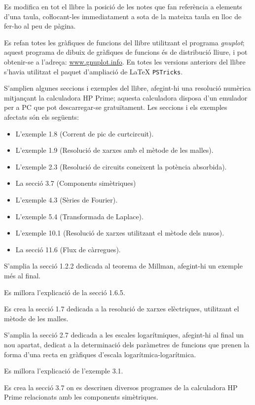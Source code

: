Es modifica en tot el llibre la posició de les notes que fan referència a elements d'una taula, coŀlocant-les immediatament a sota de la mateixa taula en lloc de fer-ho al peu de pàgina.

Es refan totes les gràfiques de funcions del llibre utilitzant el programa \emph{gnuplot}; aquest programa de dibuix de gràfiques de funcions és de distribució lliure, i pot obtenir-se a l'adreça: \href{http://www.gnuplot.info/}{www.gnuplot.info}. En totes les versions anteriors del llibre s'havia utilitzat el paquet d'ampliació de \LaTeX{} \texttt{PSTricks}.

S'amplien algunes seccions i exemples del llibre, afegint-hi una  resolució numèrica mitjançant la calculadora \textsf{HP Prime};  aquesta calculadora disposa d'un emulador per a PC que pot descarregar-se gratuïtament. Les seccions i els exemples afectats són els següents:
\begin{itemize}
  \item L'exemple 1.8  (Corrent de pic de curtcircuit).
  \item L'exemple 1.9 (Resolució de xarxes amb el mètode de les malles).
  \item L'exemple 2.3 (Resolució de circuits coneixent la potència absorbida).
  \item La secció 3.7 (Components simètriques)
  \item L'exemple 4.3 (Sèries de Fourier).
  \item L'exemple 5.4 (Transformada de Laplace).
  \item L'exemple 10.1 (Resolució de xarxes utilitzant el mètode dels nusos).
  \item La secció 11.6 (Flux de càrregues).
\end{itemize}

S'amplia la secció 1.2.2 dedicada al teorema de Millman, afegint-hi un exemple més al final.

Es millora l'explicació de la secció 1.6.5.

Es crea la secció 1.7 dedicada a la resolució de xarxes elèctriques, utilitzant el mètode de les malles.

S'amplia la secció 2.7 dedicada a les escales logarítmiques, afegint-hi al final un nou apartat, dedicat a la determinació dels paràmetres de funcions que prenen la forma d'una recta en gràfiques d'escala logarítmica-logarítmica.

Es millora l'explicació de l'exemple 3.1.

Es crea la secció 3.7 on es descriuen diversos programes de la calculadora
\textsf{HP Prime} relacionats amb les components simètriques.


